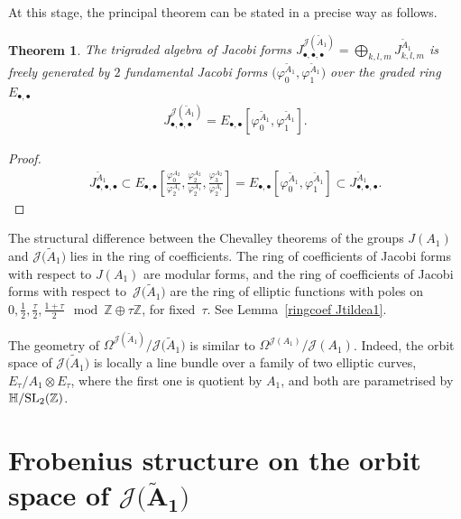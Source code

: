 \documentclass[pdftex]{sigma}%
\numberwithin{equation}{section}
\newtheorem{Theorem}{Theorem}[section]
\newcommand{\Ja}{\mathcal{J}}
\begin{document}
At this stage, the principal theorem can be stated in a precise way as follows.

\begin{Theorem}\label{chevalley Jtildea1}
The trigraded algebra of Jacobi forms $J_{\bullet,\bullet,\bullet}^{\Ja(\tilde A_1)}=\bigoplus _{k,l,m}J_{k,l,m}^{\tilde A_1}$ is freely generated by $2$ fundamental Jacobi forms $\big(\varphi_0^{\tilde A_1},\varphi_1^{\tilde A_1}\big)$ over the graded ring $E_{\bullet,\bullet}$
\begin{gather*}
J_{\bullet,\bullet,\bullet}^{\Ja(\tilde A_1)}=E_{\bullet,\bullet}\left [\varphi_0^{\tilde A_1},\varphi_1^{\tilde A_1}\right ].
\end{gather*}
\end{Theorem}
\begin{proof}
\begin{gather*}
J_{\bullet,\bullet,\bullet}^{\tilde A_1}\subset E_{\bullet,\bullet}\left [\frac{\varphi_0^{A_{2}}}{\varphi_2^{A_1}},\frac{\varphi_2^{A_{2}}}{\varphi_2^{A_1}},\frac{\varphi_3^{A_{2}}}{\varphi_2^{A_1}}\right ]=E_{\bullet,\bullet}\left [\varphi_0^{\tilde A_1},\varphi_1^{\tilde A_1}\right ]\subset J_{\bullet,\bullet,\bullet}^{\tilde A_1}.
\tag*{\qed}
\end{gather*}
\renewcommand{\qed}{}
\end{proof}

\begin{Remark}
The structural difference between the Chevalley theorems of the groups $J(A_1)$ and $\Ja\big(\tilde A_1\big)$ lies in the ring of coefficients. The ring of coefficients of Jacobi forms with respect to $J(A_1)$ are modular forms, and the ring of coefficients of Jacobi forms with respect to~$\Ja\big(\tilde A_1\big)$
are the ring of elliptic functions with poles on $0, \frac{1}{2}, \frac{\tau}{2}, \frac{1+\tau}{2} \mod \mathbb{Z}\oplus\tau\mathbb{Z}$, for fixed~$\tau$.
See Lemma~\ref{ringcoef Jtildea1}.
\end{Remark}

\begin{Remark}The geometry of $\Omega^{\Ja(\tilde A_1)}/\Ja\big(\tilde A_1\big)$ is similar to $\Omega^{\Ja( A_1)}/\Ja( A_1)$. Indeed, the orbit space of $\Ja\big(\tilde A_1\big)$ is locally a line bundle over a family of two elliptic curves, $E_{\tau}/A_1\otimes E_{\tau}$, where the first one is quotient by $A_1$, and both are parametrised by $\mathbb{H}/{\rm SL}_2(\mathbb{Z})$.
\end{Remark}

\section[Frobenius structure on the orbit space of Ja(A1)]{Frobenius structure on the orbit space of $\boldsymbol{\Ja\big(\tilde A_1\big)}$}\label{Frobenius structure A1}
\end{document}
